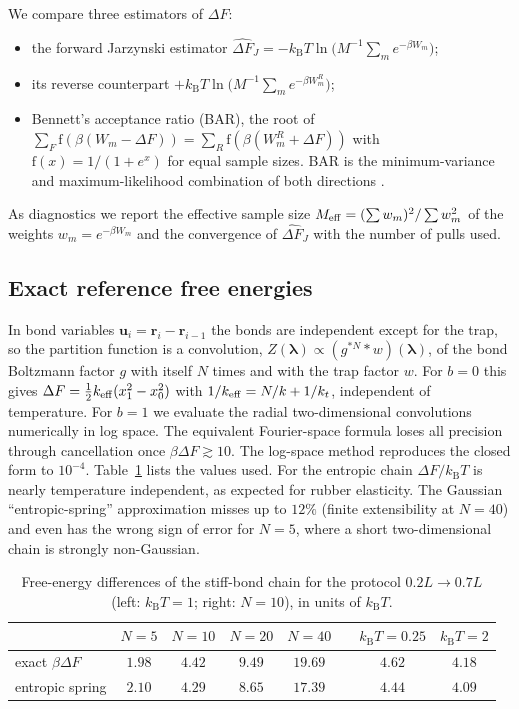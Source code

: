 \documentclass[11pt,a4paper]{article}
\newcommand{\kT}{k_{\mathrm B}T}
\newcommand{\lam}{\bm{\lambda}}
\newcommand{\dFJ}{\widehat{\Delta F}_J}
\begin{document}
We compare three estimators of $\Delta F$:
\begin{itemize}[leftmargin=*,itemsep=1pt]
\item the forward Jarzynski estimator $\dFJ=-\kT\ln\big(M^{-1}\sum_me^{-\beta W_m}\big)$;
\item its reverse counterpart $+\kT\ln\big(M^{-1}\sum_me^{-\beta W^R_m}\big)$;
\item Bennett's acceptance ratio (BAR), the root of
$\sum_F\mathrm f(\beta(W_m-\Delta F))=\sum_R\mathrm f(\beta(W^R_m+\Delta F))$ with $\mathrm f(x)=1/(1+e^x)$ for
equal sample sizes. BAR is the minimum-variance and maximum-likelihood combination of both directions \cite{B76,S03}.
\end{itemize}
As diagnostics we report the effective sample size $M_{\rm eff}=(\sum w_m)^2/\sum w_m^2$ of the weights
$w_m=e^{-\beta W_m}$ and the convergence of $\dFJ$ with the number of pulls used.

\subsection{Exact reference free energies}

In bond variables $\bm u_i=\bm r_i-\bm r_{i-1}$ the bonds are independent except for the trap, so the
partition function is a convolution, $Z(\lam)\propto(g^{*N}*w)(\lam)$, of the bond Boltzmann factor $g$
with itself $N$ times and with the trap factor $w$. For $b=0$ this gives
$\Delta F=\tfrac12k_{\rm eff}(x_1^2-x_0^2)$ with $1/k_{\rm eff}=N/k+1/k_t$, independent of temperature. For
$b=1$ we evaluate the radial two-dimensional convolutions numerically in log space. The equivalent
Fourier-space formula loses all precision through cancellation once $\beta\Delta F\gtrsim10$. The
log-space method reproduces the closed form to $10^{-4}$. Table~\ref{tab:dF} lists the values used. For the
entropic chain $\Delta F/\kT$ is nearly temperature independent, as expected for rubber elasticity. The
Gaussian ``entropic-spring'' approximation misses up to $12\%$ (finite extensibility at $N=40$) and even
has the wrong sign of error for $N=5$, where a short two-dimensional chain is strongly non-Gaussian.

\begin{table}[t]
\centering\small
\begin{tabular}{lccccccc}
\toprule
& $N=5$ & $N=10$ & $N=20$ & $N=40$ & & $\kT=0.25$ & $\kT=2$\\
\midrule
exact $\beta\Delta F$ & $1.98$ & $4.42$ & $9.49$ & $19.69$ & & $4.62$ & $4.18$\\
entropic spring & $2.10$ & $4.29$ & $8.65$ & $17.39$ & & $4.44$ & $4.09$\\
\bottomrule
\end{tabular}
\caption{Free-energy differences of the stiff-bond chain for the protocol $0.2L\to0.7L$ (left: $\kT=1$; right: $N=10$),
in units of $\kT$.}
\label{tab:dF}
\end{table}
\end{document}
